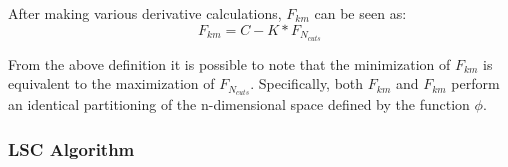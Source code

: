 After making various derivative calculations, $ F_{km} $ can be seen as: 
\begin{equation}
    F_{km} = C - K * F_{N_{cuts}} 
\end{equation}

From the above definition it is possible to note that the minimization of 
$ F_{km} $ is equivalent to the maximization of $ F_{N_{cuts}} $. Specifically, both $ F_{km} $ and 
$ F_{km} $ perform an identical partitioning of the n-dimensional space defined by 
the function $ \phi $.

\subsubsection{LSC Algorithm}

